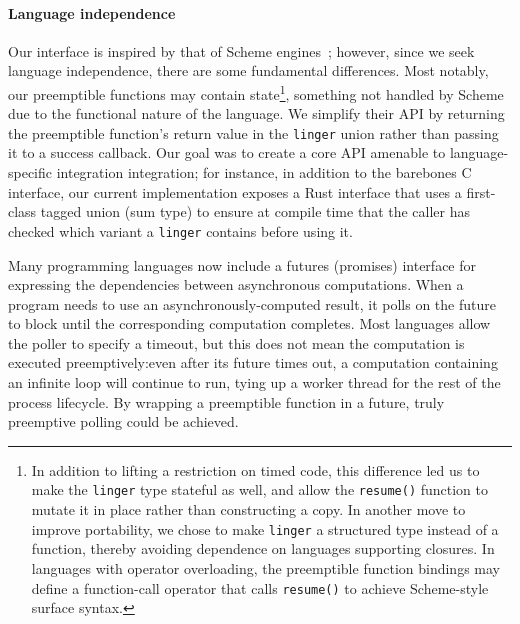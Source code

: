 \paragraph{Language independence}
Our interface is inspired by that of Scheme engines~\cite{haynes:iucs1984}; however,
since we seek language independence, there are some fundamental differences.  Most
notably, our preemptible functions may contain state\footnote{In addition to lifting
a restriction on timed code, this difference led us to make the \texttt{linger} type
stateful as well, and allow the \texttt{resume()} function to mutate it in place
rather than constructing a copy.  In another move to improve portability, we chose to
make \texttt{linger} a structured type instead of a function, thereby avoiding
dependence on languages supporting closures.  In languages with operator
overloading, the preemptible function bindings may define a function-call operator
that calls \texttt{resume()} to achieve Scheme-style surface syntax.}, something not
handled by Scheme due to the functional nature of the language.  We simplify
their API by returning the preemptible function's return value in the \texttt{linger}
union rather than passing it to a success callback.  Our goal was to create a core
API amenable to language-specific integration
integration; for instance, in addition to the barebones C interface, our current
implementation exposes a Rust interface that uses a first-class tagged union (sum
type) to ensure at compile time that the caller has checked which variant a
\texttt{linger} contains before using it.

\vspace{\parsep}
Many programming languages now include a futures (promises) interface for expressing
the dependencies between asynchronous computations.  When a program needs to use an
asynchronously-computed result, it polls on the future to block until the
corresponding computation completes.  Most languages allow the poller to specify a
timeout, but this does not mean the computation is executed preemptively:\@ even
after its future times out, a computation containing an infinite loop will continue
to run, tying up a worker thread for the rest of the process lifecycle.  By wrapping
a preemptible function in a future, truly preemptive polling could be achieved.
